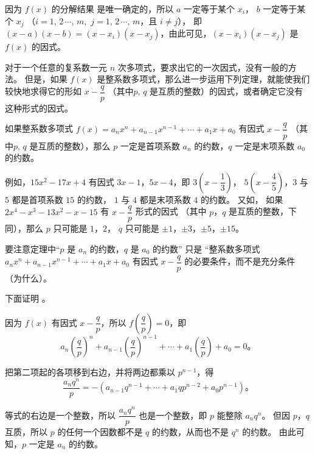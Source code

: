 \zhengming 因为 $f(x)$ 的分解结果  是唯一确定的，所以 $a$ 一定等于某个 $x_i$，
$b$ 一定等于某个 $x_j$ （$i = 1,\, 2\, \cdots,\, m,$ $j = 1,\, 2\, \cdots,\, m$，且 $i \neq j$），
即 $(x - a) (x - b) = (x - x_i) (x - x_j)$，由此可见，$(x - x_i) (x - x_j)$ 是 $f(x)$ 的因式。


对于一个任意的复系数一元 $n$ 次多项式，要求出它的一次因式，没有一般的方法。
但是，如果 $f(x)$ 是整系数多项式，那么进一步运用下列定理，就能使我们较快地求得它的形如
$x - \dfrac{q}{p}$ （其中$p,\, q$ 是互质的整数）的因式，或者确定它没有这种形式的因式。

\begin{theorem} \label{theorem:dxs-2}
    如果整系数多项式 $f(x) = a_nx^n + a_{n-1}x^{n-1} + \cdots + a_1x + a_0$ 有因式
    $x - \dfrac{q}{p}$ （其中$p,\, q$ 是互质的整数），那么
    $p$ 一定是首项系数 $a_n$ 的约数，$q$ 一定是末项系数 $a_0$ 的约数。
\end{theorem}

例如，$15x^2 - 17x + 4$ 有因式 $3x - 1$，$5x - 4$，即 $3 \left( x - \dfrac{1}{3} \right)$，
$5 \left( x - \dfrac{4}{5} \right)$，$3$ 与 $5$ 都是首项系数 $15$ 的约数，
$1$ 与 $4$ 都是末项系数 $4$ 的约数。
又如， 如果 $2x^4 - x^3 - 13x^2 - x - 15$ 有 $x - \dfrac{q}{p}$ 形式的因式
（其中 $p$，$q$ 是互质的整数，下同），那么 $p$ 只可能是 $1$，$2$，
$q$ 只可能是 $\pm 1$，$\pm 3$，$\pm 5$，$\pm 15$。


要注意定理中“$p$ 是 $a_n$ 的约数，$q$ 是 $a_0$ 的约数” 只是 “整系数多项式
$a_nx^n + a_{n-1}x^{n-1} + \cdots + a_1x + a_0$ 有因式 $x - \dfrac{q}{p}$
的必要条件，而不是充分条件（为什么）。


下面证明 。

\zhengming 因为 $f(x)$ 有因式 $x - \dfrac{q}{p}$，所以 $f \left( \dfrac{q}{p} \right) = 0$，即
$$ a_n \left( \dfrac{q}{p} \right)^n + a_{n-1} \left( \dfrac{q}{p} \right)^{n-1} + \cdots + a_1 \left( \dfrac{q}{p} \right) + a_0 = 0 \text{。} $$

把第二项起的各项移到右边，并将两边都乘以 $p^{n-1}$，得
$$ \dfrac{a_n q^n}{p} = - (a_{n-1} q^{n-1} + \cdots + a_1 q p^{n-2} + a_0 p^{n-1}) \text{。} $$

等式的右边是一个整数，所以 $\dfrac{a_n q^n}{p}$ 也是一个整数，即 $p$ 能整除 $a_n q^n$。
但因 $p$，$q$ 互质，所以 $p$ 的任何一个因数都不是 $q$ 的约数，从而也不是 $q^n$ 的约数\footnotemark。
由此可知，$p$ 一定是 $a_n$ 的约数。

